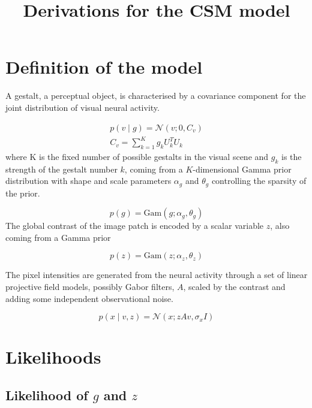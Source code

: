 \documentclass{paper}
\begin{document}
\title{Derivations for the CSM model}
\maketitle

\section{Definition of the model}

A gestalt, a perceptual object, is characterised by a covariance component for the joint distribution of visual neural activity. 

\begin{eqnarray}
p(v \mid g) = \mathcal{N}(v; 0,C_v) \\
C_v = \sum_{k=1}^K g_k U^T_k U_k \label{eq:cv}
\end{eqnarray}
%
where K is the fixed number of possible gestalts in the visual scene and $g_k$ is the strength of the gestalt number $k$, coming from a $K$-dimensional Gamma prior distribution with shape and scale  parameters $\alpha_g$ and $\theta_g$ controlling the sparsity of the prior.

\begin{equation}
p(g) = \textrm{Gam}(g; \alpha_g,\theta_g)
\end{equation}
%
The global contrast of the image patch is encoded by a scalar variable $z$, also coming from a Gamma prior

\begin{equation}
p(z) = \textrm{Gam}(z; \alpha_z,\theta_z)
\end{equation}

The pixel intensities are generated from the neural activity through a set of linear projective field models, possibly Gabor filters, $A$, scaled by the contrast and adding some independent observational noise.

\begin{equation}
p(x \mid v,z) = \mathcal{N}(x; zAv,\sigma_x I)
\end{equation}

\section{Likelihoods}

\subsection{Likelihood of $g$ and $z$}
\end{document}
